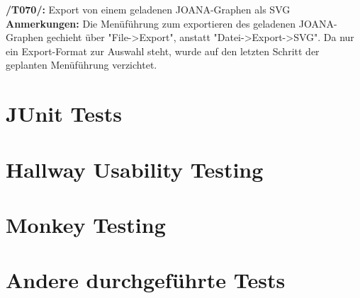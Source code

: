 \textbf{/T070/: }Export von einem geladenen JOANA-Graphen als SVG\\
\textbf{Anmerkungen: }Die Menüführung zum exportieren des geladenen JOANA-Graphen gechieht über "File->Export", anstatt "Datei->Export->SVG". Da nur ein Export-Format zur Auswahl steht, wurde auf den letzten Schritt der geplanten Menüführung verzichtet.\\


\section{JUnit Tests}


\section{Hallway Usability Testing}


\section{Monkey Testing}

\section{Andere durchgeführte Tests}
